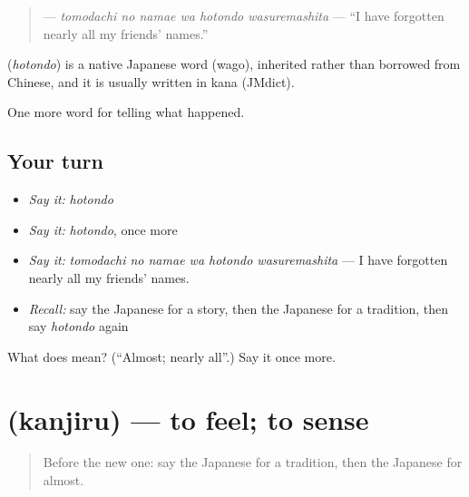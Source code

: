 \begin{quote}
\textbf{   } — \emph{tomodachi no namae wa hotondo wasuremashita} — \textquotedblleft{}I have forgotten nearly all my friends' names.\textquotedblright{}
\end{quote}

\begin{cousinweb}
\textbf{} (\emph{hotondo}) is a native Japanese word (wago), inherited rather than borrowed from Chinese, and it is usually written in kana (JMdict).
\end{cousinweb}

\begin{grammarlens}[title={What you've built}]
One more word for telling what happened.
\end{grammarlens}

\subsection*{Your turn}
\begin{itemize}
\raggedright
  \item \emph{Say it:} \emph{hotondo}
  \item \emph{Say it:} \emph{hotondo}, once more
  \item \emph{Say it:} \emph{tomodachi no namae wa hotondo wasuremashita} — I have forgotten nearly all my friends' names.
  \item \emph{Recall:} say the Japanese for a story, then the Japanese for a tradition, then say \emph{hotondo} again
\end{itemize}

\begin{tcolorbox}[breakable,colback=teal!4,colframe=teal!35!black,title={Before you move on}]
What does  mean? (\textquotedblleft{}Almost; nearly all\textquotedblright{}.) Say it once more.
\end{tcolorbox}
\section[\texorpdfstring{\ja{かんじる} (kanjiru)}{かんじる (kanjiru)}]{ (kanjiru) — to feel; to sense}

\label{lesson:JA-C316-kanjiru}



\begin{quote}
Before the new one: say the Japanese for a tradition, then the Japanese for almost.
\end{quote}

